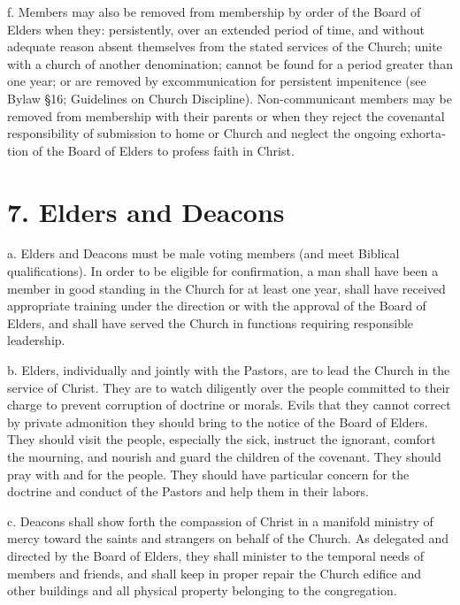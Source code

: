 \documentclass[
]{book}
\begin{document}
f. Members may also be removed from member­ship by order of the Board of Elders when they: persis­tently, over an extended period of time, and without adequate reason absent themselves from the stated services of the Church; unite with a church of another denomination; cannot be found for a period greater than one year; or are removed by excommunication for persistent impenitence (see Bylaw §16; Guidelines on Church Discipline). Non-communicant members may be removed from membership with their parents or when they reject the covenantal responsibility of submission to home or Church and neglect the ongoing exhort­a­tion of the Board of Elders to profess faith in Christ.

\hypertarget{elders-and-deacons}{%
\section{7. Elders and Deacons}\label{elders-and-deacons}}

a. Elders and Deacons must be male voting members (and meet Biblical qualifications). In order to be eligible for confirmation, a man shall have been a member in good standing in the Church for at least one year, shall have received appropriate training under the direction or with the approval of the Board of Elders, and shall have served the Church in functions requiring responsible leadership.

b. Elders, individually and jointly with the Pastors, are to lead the Church in the service of Christ. They are to watch diligently over the people committed to their charge to prevent corruption of doctrine or morals. Evils that they cannot correct by private admoni­tion they should bring to the notice of the Board of Elders. They should visit the people, especially the sick, instruct the ignorant, comfort the mourning, and nourish and guard the children of the covenant. They should pray with and for the people. They should have particular concern for the doctrine and conduct of the Pastors and help them in their labors.

c. Deacons shall show forth the compassion of Christ in a manifold ministry of mercy toward the saints and strangers on behalf of the Church. As delegated and directed by the Board of Elders, they shall minister to the temporal needs of members and friends, and shall keep in proper repair the Church edifice and other buildings and all physical property belonging to the congregation.
\end{document}
